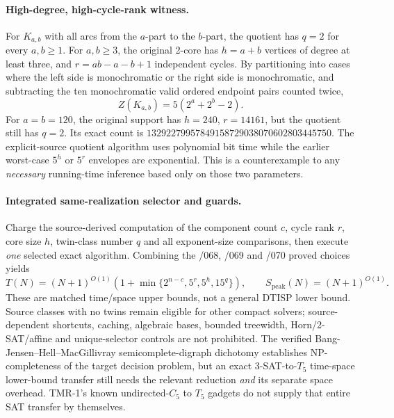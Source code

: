 \documentclass[11pt]{article}
\begin{document}
\paragraph{High-degree, high-cycle-rank witness.}
For $K_{a,b}$ with all arcs from the $a$-part to the $b$-part,
the quotient has $q=2$ for every $a,b\ge1$.
For $a,b\ge3$, the original 2-core has $h=a+b$ vertices
of degree at least three, and
$r=ab-a-b+1$ independent cycles.
By partitioning into cases where the left side is monochromatic
or the right side is monochromatic, and subtracting the ten
monochromatic valid ordered endpoint pairs counted twice,
\[
 \boxed{Z(K_{a,b})=5(2^a+2^b-2).}
\]
For $a=b=120$, the original support has
$h=240$, $r=14161$, but the quotient still has $q=2$.
Its exact count is
$13292279957849158729038070602803445750$.
The explicit-source quotient algorithm uses polynomial bit time
while the earlier worst-case $5^h$ or $5^r$ envelopes are
exponential. This is a counterexample to any \emph{necessary}
running-time inference based only on those two parameters.

\paragraph{Integrated same-realization selector and guards.}
Charge the source-derived computation of the component count $c$,
cycle rank $r$, core size $h$, twin-class number $q$ and all
exponent-size comparisons, then execute \emph{one} selected exact
algorithm. Combining the /068, /069 and /070 proved choices yields
\[
 T(N)=(N+1)^{O(1)}
 \left(1+\min\{2^{n-c},5^r,5^h,15^q\}\right),\qquad
 S_{\mathrm{peak}}(N)=(N+1)^{O(1)}.
\]
These are matched time/space upper bounds, not a general
$\mathrm{DTISP}$ lower bound. Source classes with no twins remain
eligible for other compact solvers; source-dependent shortcuts,
caching, algebraic bases, bounded treewidth, Horn/2-SAT/affine
and unique-selector controls are not prohibited.
The verified Bang-Jensen--Hell--MacGillivray semicomplete-digraph
dichotomy establishes NP-completeness of the target decision
problem, but an exact 3-SAT-to-$T_5$ time-space lower-bound
transfer still needs the relevant reduction \emph{and} its
separate space overhead. TMR-1's known undirected-$C_5$ to
$T_5$ gadgets do not supply that entire SAT transfer by themselves.
\end{document}
